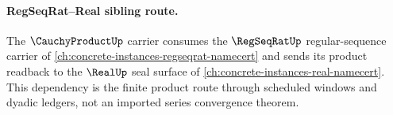\paragraph{RegSeqRat--Real sibling route.}
The $\CauchyProductUp$ carrier consumes the $\RegSeqRatUp$ regular-sequence carrier of \autoref{ch:concrete-instances-regseqrat-namecert} and sends its product readback to the $\RealUp$ seal surface of \autoref{ch:concrete-instances-real-namecert}. This dependency is the finite product route through scheduled windows and dyadic ledgers, not an imported series convergence theorem.
